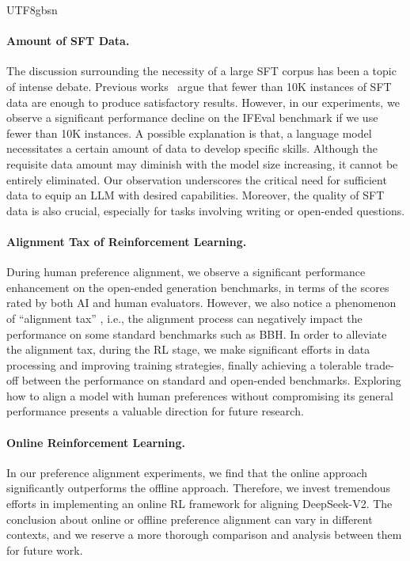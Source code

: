 \documentclass[11pt, a4paper, logo, copyright, nonumbering]{deepseek}
\newcommand{\dsvii}{DeepSeek-V2}
\begin{document}
\begin{CJK*}{UTF8}{gbsn}
\paragraph{Amount of SFT Data.}
The discussion surrounding the necessity of a large SFT corpus has been a topic of intense debate. 
Previous works~\citep{yi, lima} argue that fewer than 10K instances of SFT data are enough to produce satisfactory results. 
However, in our experiments, we observe a significant performance decline on the IFEval benchmark if we use fewer than 10K instances. 
A possible explanation is that, a language model necessitates a certain amount of data to develop specific skills. 
Although the requisite data amount may diminish with the model size increasing, it cannot be entirely eliminated. 
Our observation underscores the critical need for sufficient data to equip an LLM with desired capabilities. 
Moreover, the quality of SFT data is also crucial, especially for tasks involving writing or open-ended questions. 

\paragraph{Alignment Tax of Reinforcement Learning.}
During human preference alignment, we observe a significant performance enhancement on the open-ended generation benchmarks, in terms of the scores rated by both AI and human evaluators. 
However, we also notice a phenomenon of ``alignment tax'' \citep{ouyang2022training}, i.e., the alignment process can negatively impact the performance on some standard benchmarks such as BBH. 
In order to alleviate the alignment tax, during the RL stage, we make significant efforts in data processing and improving training strategies, finally achieving a tolerable trade-off between the performance on standard and open-ended benchmarks. 
Exploring how to align a model with human preferences without compromising its general performance presents a valuable direction for future research.

\paragraph{Online Reinforcement Learning.}
In our preference alignment experiments, we find that the online approach significantly outperforms the offline approach. 
Therefore, we invest tremendous efforts in implementing an online RL framework for aligning \dsvii{}. 
The conclusion about online or offline preference alignment can vary in different contexts, and we reserve a more thorough comparison and analysis between them for future work.


\end{CJK*}
\end{document}

